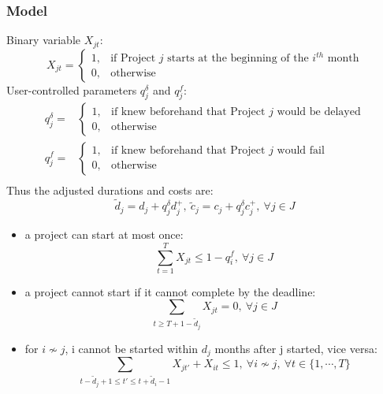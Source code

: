 \documentclass{beamer}
\begin{document}
		\begin{frame}
			\frametitle{Model}
			Binary variable $X_{jt}$:
			\begin{equation*}
				X_{jt}=
				\begin{cases}
					1, & \text{if Project } j \text{ starts at the beginning of the } i^{th} \text{ month} \\
					0, & \text{otherwise}
				\end{cases}
			\end{equation*}
			User-controlled parameters $q^{\delta}_j$ and $q^f_j$:
			\begin{equation*}
				\begin{array}{cl}
					q^{\delta}_j= &
					\begin{cases}
						1, & \text{if knew beforehand that Project } j \text{ would be delayed} \\
						0, & \text{otherwise}
					\end{cases}\\
					q^{f}_j= &
					\begin{cases}
						1, & \text{if knew beforehand that Project } j \text{ would fail} \\
						0, & \text{otherwise}
					\end{cases}\\
				\end{array}
			\end{equation*}
			Thus the adjusted durations and costs are:
			\begin{equation*}
				\tilde{d}_j=d_j+q^{\delta}_j d^+_j
				,~
				\tilde{c}_j=c_j+q^{\delta}_j c^+_j
				,~\forall j \in J
			\end{equation*}
		\end{frame}
		
		\begin{frame}
			\begin{itemize}
				\item a project can start at most once:
					\begin{equation*}
						\sum\limits_{t=1}^{T} X_{jt} \leq 1-q^f_i,~\forall j \in J
					\end{equation*}
				\item a project cannot start if it cannot complete by the deadline:
					\begin{equation*}
						\sum\limits_{t\geq T+1-\tilde{d}_j} X_{jt}=0,~\forall j \in J
					\end{equation*}
				\item for $i \nsim j$, i cannot be started within $d_j$ months after j started, vice versa:
					\begin{equation*}
						\sum\limits_{t-\tilde{d}_j+1\leq t'\leq t+\tilde{d}_i-1} X_{jt'} + X_{it} \leq 1,~\forall i \nsim j,~\forall t \in \{1,\cdots,T\}
					\end{equation*}
			\end{itemize}
		\end{frame}
		
\end{document}
